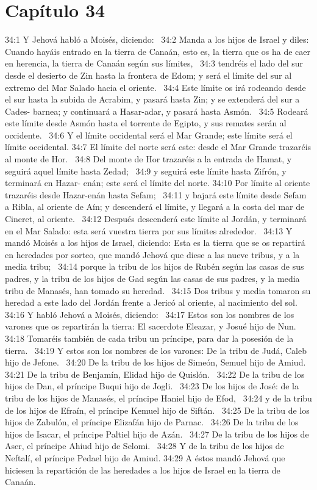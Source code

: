 \section*{Capítulo 34 }

34:1 Y Jehová habló a Moisés, diciendo:  
34:2 Manda a los hijos de Israel y diles: Cuando hayáis entrado en la tierra de Canaán, esto es, la tierra que os ha de caer en herencia, la tierra de Canaán según sus límites,  
34:3 tendréis el lado del sur desde el desierto de Zin hasta la frontera de Edom; y será el límite del sur al extremo del Mar Salado hacia el oriente.  
34:4 Este límite os irá rodeando desde el sur hasta la subida de Acrabim, y pasará hasta Zin; y se extenderá del sur a Cades- barnea; y continuará a Hasar-adar, y pasará hasta Asmón.  
34:5 Rodeará este límite desde Asmón hasta el torrente de Egipto, y sus remates serán al occidente.  
34:6 Y el límite occidental será el Mar Grande; este límite será el límite occidental. 
34:7 El límite del norte será este: desde el Mar Grande trazaréis al monte de Hor.  
34:8 Del monte de Hor trazaréis a la entrada de Hamat, y seguirá aquel límite hasta Zedad;  
34:9 y seguirá este límite hasta Zifrón, y terminará en Hazar- enán; este será el límite del norte. 
34:10 Por límite al oriente trazaréis desde Hazar-enán hasta Sefam;  
34:11 y bajará este límite desde Sefam a Ribla, al oriente de Aín; y descenderá el límite, y llegará a la costa del mar de Cineret, al oriente.  
34:12 Después descenderá este límite al Jordán, y terminará en el Mar Salado: esta será vuestra tierra por sus límites alrededor.  
34:13 Y mandó Moisés a los hijos de Israel, diciendo: Esta es la tierra que se os repartirá en heredades por sorteo, que mandó Jehová que diese a las nueve tribus, y a la media tribu;  
34:14 porque la tribu de los hijos de Rubén según las casas de sus padres, y la tribu de los hijos de Gad según las casas de sus padres, y la media tribu de Manasés, han tomado su heredad.  
34:15 Dos tribus y media tomaron su heredad a este lado del Jordán frente a Jericó al oriente, al nacimiento del sol.  
34:16 Y habló Jehová a Moisés, diciendo:  
34:17 Estos son los nombres de los varones que os repartirán la tierra: El sacerdote Eleazar, y Josué hijo de Nun.  
34:18 Tomaréis también de cada tribu un príncipe, para dar la posesión de la tierra.  
34:19 Y estos son los nombres de los varones: De la tribu de Judá, Caleb hijo de Jefone.  
34:20 De la tribu de los hijos de Simeón, Semuel hijo de Amiud.  
34:21 De la tribu de Benjamín, Elidad hijo de Quislón.  
34:22 De la tribu de los hijos de Dan, el príncipe Buqui hijo de Jogli.  
34:23 De los hijos de José: de la tribu de los hijos de Manasés, el príncipe Haniel hijo de Efod,  
34:24 y de la tribu de los hijos de Efraín, el príncipe Kemuel hijo de Siftán.  
34:25 De la tribu de los hijos de Zabulón, el príncipe Elizafán hijo de Parnac.  
34:26 De la tribu de los hijos de Isacar, el príncipe Paltiel hijo de Azán.  
34:27 De la tribu de los hijos de Aser, el príncipe Ahiud hijo de Selomi.  
34:28 Y de la tribu de los hijos de Neftalí, el príncipe Pedael hijo de Amiud. 
34:29 A éstos mandó Jehová que hiciesen la repartición de las heredades a los hijos de Israel en la tierra de Canaán.  
